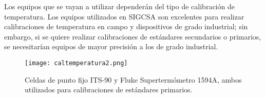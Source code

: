 \par \noindent
Los equipos que se vayan a utilizar dependerán del tipo de calibración de temperatura. Los equipos utilizados en SIGCSA son excelentes para realizar calibraciones de temperatura en campo y dispositivos de grado industrial; sin embargo, si se quiere realizar calibraciones de estándares secundarios o primarios, se necesitarían equipos de mayor precisión a los de grado industrial.

\begin{figure}[H]
	\centering
	\texttt{[image: caltemperatura2.png]}
	\caption{Celdas de punto fijo ITS-90 y Fluke Supertermómetro 1594A, ambos utilizados para calibraciones de estándares primarios.}
\end{figure}
